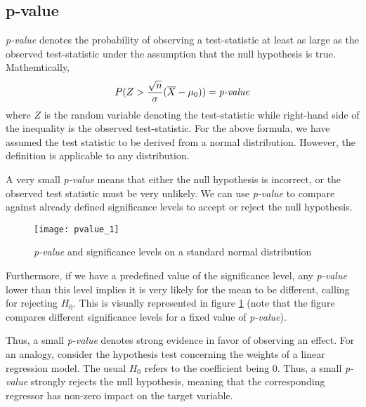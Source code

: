 \documentclass[../probability-notes.tex]{subfiles}
\begin{document}
    \subsection{p-value}\label{p_value}
    \emph{p-value} denotes the probability of observing a test-statistic at least as large as the observed test-statistic under the assumption that the null hypothesis is true. Mathemtically,
    \begin{align*}
        P(Z > \frac{\sqrt{n}}{\sigma}(\overline{X} - \mu_{0})) = \text{\emph{p-value}}
    \end{align*}
    where $Z$ is the random variable denoting the test-statistic while right-hand side of the inequality is the observed test-statistic. For the above formula, we have assumed the test statistic to be derived from a normal distribution. However, the definition is applicable to any distribution.\newline

    A very small \emph{p-value} means that either the null hypothesis is incorrect, or the observed test statistic must be very unlikely. We can use \emph{p-value} to compare against already defined significance levels to accept or reject the null hypothesis.

    \begin{figure}[h]
    \texttt{[image: pvalue\_1]}
    \centering
    \caption{\emph{p-value} and significance levels on a standard normal distribution}
    \label{fig:pvalue_1} %
    \end{figure}

    Furthermore, if we have a predefined value of the significance level, any \emph{p-value} lower than this level implies it is very likely for the mean to be different, calling for rejecting $H_{0}$. This is visually represented in figure \ref{fig:pvalue_1} (note that the figure compares different significance levels for a fixed value of \emph{p-value}).\newline

    Thus, a small \emph{p-value} denotes strong evidence in favor of observing an effect. For an analogy, consider the hypothesis test concerning the weights of a linear regression model. The usual $H_{0}$ refers to the coefficient being $0$. Thus, a small \emph{p-value} strongly rejects the null hypothesis, meaning that the corresponding regressor has non-zero impact on the target variable.

\end{document}
